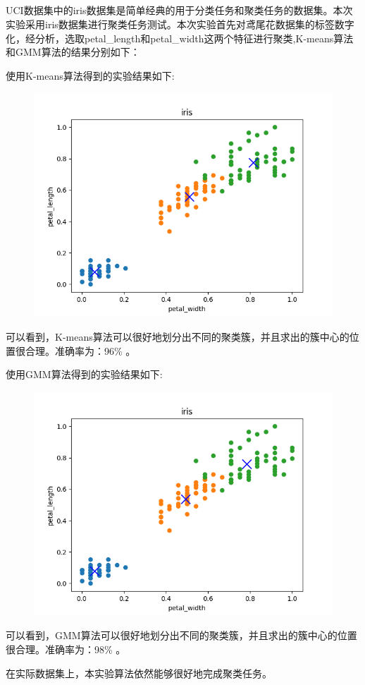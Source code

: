 \documentclass[lang=cn,a4paper,cite=authoryear]{elegantpaper}
\begin{document}
\subsection*{}
UCI数据集中的iris数据集是简单经典的用于分类任务和聚类任务的数据集。本次实验采用iris数据集进行聚类任务测试。本次实验首先对鸢尾花数据集的标签数字化，经分析，选取petal\_length和petal\_width这两个特征进行聚类,K-means算法和GMM算法的结果分别如下：
\par 使用K-means算法得到的实验结果如下:
\begin{center}
	\begin{figure}[H]
		\centering
		\includegraphics[scale=0.6]{figure_3}
	\end{figure}
\end{center}
可以看到，K-means算法可以很好地划分出不同的聚类簇，并且求出的簇中心的位置很合理。准确率为：96\% 。

\par 使用GMM算法得到的实验结果如下:
\begin{center}
	\begin{figure}[H]
		\centering
		\includegraphics[scale=0.6]{figure_4}
	\end{figure}
\end{center}
可以看到，GMM算法可以很好地划分出不同的聚类簇，并且求出的簇中心的位置很合理。准确率为：98\% 。
\par 在实际数据集上，本实验算法依然能够很好地完成聚类任务。
\end{document}
